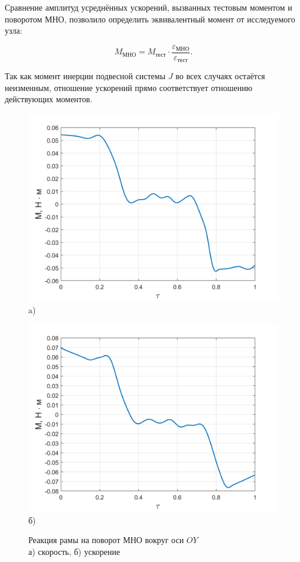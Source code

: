 Сравнение амплитуд усреднённых ускорений, вызванных тестовым моментом и поворотом МНО, позволило определить эквивалентный момент от исследуемого узла:

\begin{equation}
	M_{\text{МНО}} = M_{\text{тест}} \cdot \frac{\varepsilon_{\text{МНО}}}{\varepsilon_{\text{тест}}}.
\end{equation}

Так как момент инерции подвесной системы $J$ во всех случаях остаётся неизменным, отношение ускорений прямо соответствует отношению действующих моментов.




\begin{figure}[!h]
	\begin{minipage}[b][][b]{0.49\linewidth}\centering
		\includegraphics[width=0.9\linewidth]{matlab/img/oz-gyro-mom.png} \\ a)
	\end{minipage}
	\hfill
	\begin{minipage}[b][][b]{0.49\linewidth}\centering
		\includegraphics[width=0.9\linewidth]{matlab/img/oy-gyro-mom.png} \\ б)
	\end{minipage}
	\caption{Реакция рамы на поворот МНО вокруг оси $OY$ \\ а) скорость, б) ускорение }
	\label{fig:omn-mom}
\end{figure}

